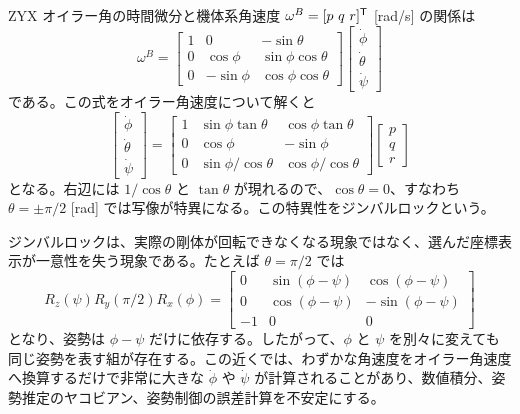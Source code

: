ZYX オイラー角の時間微分と機体系角速度 $\omega^B=[p\ q\ r]^{\mathsf{T}}$ [rad/s] の関係は
\begin{equation}
  \omega^B=
  \begin{bmatrix}
    1&0&-\sin\theta\\
    0&\cos\phi&\sin\phi\cos\theta\\
    0&-\sin\phi&\cos\phi\cos\theta
  \end{bmatrix}
  \begin{bmatrix}
    \dot{\phi}\\ \dot{\theta}\\ \dot{\psi}
  \end{bmatrix}
\end{equation}
である。この式をオイラー角速度について解くと
\begin{equation}
  \begin{bmatrix}
    \dot{\phi}\\ \dot{\theta}\\ \dot{\psi}
  \end{bmatrix}
  =
  \begin{bmatrix}
    1&\sin\phi\tan\theta&\cos\phi\tan\theta\\
    0&\cos\phi&-\sin\phi\\
    0&\sin\phi/\cos\theta&\cos\phi/\cos\theta
  \end{bmatrix}
  \begin{bmatrix}
    p\\ q\\ r
  \end{bmatrix}
\end{equation}
となる。右辺には $1/\cos\theta$ と $\tan\theta$ が現れるので、$\cos\theta=0$、すなわち $\theta=\pm\pi/2$ [rad] では写像が特異になる。この特異性をジンバルロックという。

ジンバルロックは、実際の剛体が回転できなくなる現象ではなく、選んだ座標表示が一意性を失う現象である。たとえば $\theta=\pi/2$ では
\begin{equation}
  R_z(\psi)R_y(\pi/2)R_x(\phi)
  =
  \begin{bmatrix}
    0&\sin(\phi-\psi)&\cos(\phi-\psi)\\
    0&\cos(\phi-\psi)&-\sin(\phi-\psi)\\
    -1&0&0
  \end{bmatrix}
\end{equation}
となり、姿勢は $\phi-\psi$ だけに依存する。したがって、$\phi$ と $\psi$ を別々に変えても同じ姿勢を表す組が存在する。この近くでは、わずかな角速度をオイラー角速度へ換算するだけで非常に大きな $\dot{\phi}$ や $\dot{\psi}$ が計算されることがあり、数値積分、姿勢推定のヤコビアン、姿勢制御の誤差計算を不安定にする。

